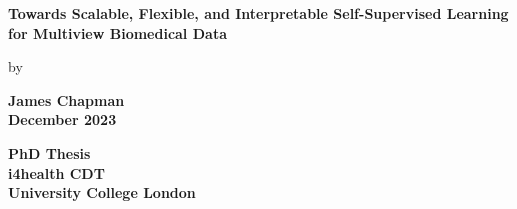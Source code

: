 \documentclass{report}
\author{James Chapman}
\numberwithin{figure}{chapter}
\numberwithin{table}{section}
\begin{document}
\begin{titlepage}
    \begin{center}
        
        {\LARGE\textbf{Towards Scalable, Flexible, and Interpretable Self-Supervised Learning for Multiview Biomedical Data}
            \author{James Chapman\\
                \\}}

        \vspace{0.8cm}
        by\\
        \vspace{0.8cm}

        {\LARGE\textbf{James Chapman\\}}
        \vspace{1.5cm}
        {\LARGE\textbf{December 2023}}

        \vfill

        \textbf{
            PhD Thesis\\
            \vspace{1cm}
            i4health CDT\\
            University College London\\}

        \vspace{2cm}
    \end{center}
\end{titlepage}

\onehalfspacing

\newpage


\newpage


\newpage


\newpage


% 

\newpage
\listoffigures

\newpage
\listoftables
\end{document}
